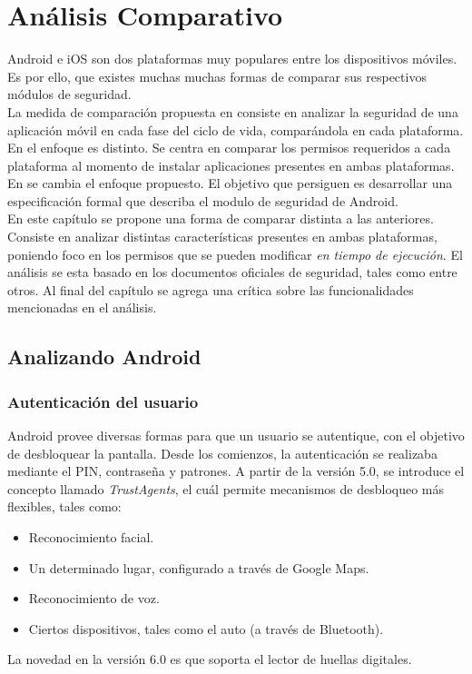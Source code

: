 \chapter{Análisis Comparativo}
Android e iOS son dos plataformas muy populares entre los dispositivos móviles. Es por ello, que existes muchas  muchas formas de comparar sus respectivos módulos de seguridad.\\

La medida de comparación propuesta en \cite{YA2014} consiste en analizar la seguridad de una aplicación móvil en cada fase del ciclo de vida, comparándola en cada plataforma.\\

En \cite{HYGZD2013} el enfoque es distinto. Se centra en comparar los permisos requeridos a cada plataforma al momento de instalar aplicaciones presentes en ambas plataformas.\\

En \cite{Gor16, BCLR15, Rom14} se cambia el enfoque propuesto. El objetivo que persiguen es desarrollar una especificación formal que describa el modulo de seguridad de Android.\\

En este capítulo se propone una forma de comparar distinta a las anteriores. Consiste en analizar distintas características presentes en ambas plataformas, poniendo foco en los permisos que se pueden modificar \emph{en tiempo de ejecución}. El análisis se esta basado en los documentos oficiales de seguridad, tales como \cite{aossec, asreview2015, asg} entre otros. Al final del capítulo se agrega una crítica sobre las funcionalidades mencionadas en el análisis.
\section{Analizando Android}
\subsection{Autenticación del usuario}
Android provee diversas formas para que un usuario se autentique, con el objetivo de desbloquear la pantalla. Desde los comienzos, la autenticación se realizaba mediante el PIN, contraseña y patrones. A partir de la versión 5.0, se introduce el concepto llamado \textit{TrustAgents}, el cuál permite mecanismos de desbloqueo más flexibles, tales como:
\begin{itemize}
	\item Reconocimiento facial.
	\item Un determinado lugar, configurado a través de Google Maps.
	\item Reconocimiento de voz.
	\item Ciertos dispositivos, tales como el auto (a través de Bluetooth).
\end{itemize}
La novedad en la versión 6.0 es que soporta el lector de huellas digitales.\\

